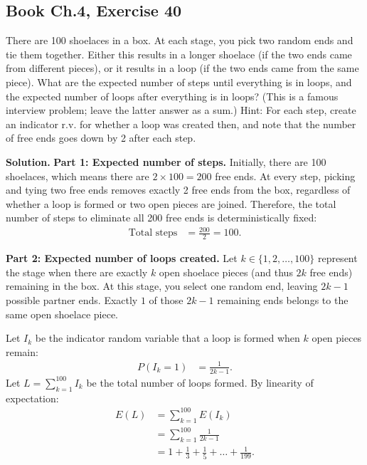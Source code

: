 \documentclass[11pt,a4paper]{article}
\begin{document}
\vspace{10pt}
\subsection{Book Ch.4, Exercise 40}
\begin{tcolorbox}[title={Book Ch.4, Exercise 40}]
There are 100 shoelaces in a box. At each stage, you pick two random ends and tie them together. Either this results in a longer shoelace (if the two ends came from different pieces), or it results in a loop (if the two ends came from the same piece). What are the expected number of steps until everything is in loops, and the expected number of loops after everything is in loops? (This is a famous interview problem; leave the latter answer as a sum.)
Hint: For each step, create an indicator r.v. for whether a loop was created then, and note that the number of free ends goes down by 2 after each step.
\end{tcolorbox}

\noindent \textbf{Solution.} \textbf{Part 1: Expected number of steps.}
Initially, there are 100 shoelaces, which means there are $2 \times 100 = 200$ free ends. At every step, picking and tying two free ends removes exactly 2 free ends from the box, regardless of whether a loop is formed or two open pieces are joined. Therefore, the total number of steps to eliminate all 200 free ends is deterministically fixed:
\begin{align*}
\text{Total steps} &= \frac{200}{2} = 100.
\end{align*}

\vspace{4pt}
\noindent \textbf{Part 2: Expected number of loops created.}
Let $k \in \{1, 2, \dots, 100\}$ represent the stage when there are exactly $k$ open shoelace pieces (and thus $2k$ free ends) remaining in the box. At this stage, you select one random end, leaving $2k - 1$ possible partner ends. Exactly $1$ of those $2k - 1$ remaining ends belongs to the same open shoelace piece.

Let $I_k$ be the indicator random variable that a loop is formed when $k$ open pieces remain:
\begin{align*}
P(I_k = 1) &= \frac{1}{2k - 1}.
\end{align*}
Let $L = \sum_{k=1}^{100} I_k$ be the total number of loops formed. By linearity of expectation:
\begin{align*}
E(L) &= \sum_{k=1}^{100} E(I_k) \\
&= \sum_{k=1}^{100} \frac{1}{2k - 1} \\
&= 1 + \frac{1}{3} + \frac{1}{5} + \dots + \frac{1}{199}.
\end{align*}
\end{document}
